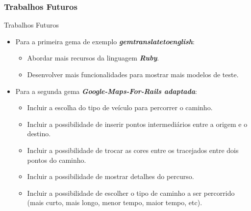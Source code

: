 \begin{frame}
\frametitle{Trabalhos Futuros}

  \begin{block}{Trabalhos Futuros}

   \begin{itemize}

    \item Para a primeira gema de exemplo \emph{\textbf{gemtranslatetoenglish}}:

    \begin{itemize}

     \item Abordar mais recursos da linguagem \emph{\textbf{Ruby}}.

     \item Desenvolver mais funcionalidades para mostrar mais modelos de teste.

    \end{itemize}

    \item Para a segunda gema \emph{\textbf{Google-Maps-For-Rails adaptada}}:

    \begin{itemize}

     \item Incluir a escolha do tipo de veículo para percorrer o caminho.

     \item Incluir a possibilidade de inserir pontos intermediários entre a origem e o destino.

     \item Incluir a possibilidade de trocar as cores entre os tracejados entre dois pontos do caminho.
     
     \item Incluir a possibilidade de mostrar detalhes do percurso.

     \item Incluir a possibilidade de escolher o tipo de caminho a ser percorrido
     (mais curto, mais longo, menor tempo, maior tempo, etc).

    \end{itemize}


   \end{itemize}

  \end{block}

\end{frame}


